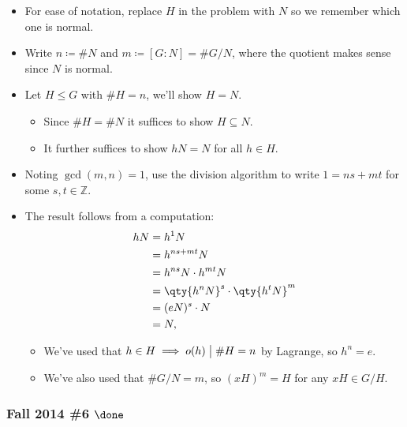 \begin{solution}

\envlist

\begin{itemize}
\tightlist
\item
  For ease of notation, replace \(H\) in the problem with \(N\) so we
  remember which one is normal.
\item
  Write \(n\coloneqq\# N\) and \(m \coloneqq[G:N] = \#G/N\), where the
  quotient makes sense since \(N\) is normal.
\item
  Let \(H \leq G\) with \(\# H = n\), we'll show \(H=N\).

  \begin{itemize}
  \tightlist
  \item
    Since \(\# H = \# N\) it suffices to show \(H \subseteq N\).
  \item
    It further suffices to show \(hN = N\) for all \(h\in H\).
  \end{itemize}
\item
  Noting \(\gcd(m, n)=1\), use the division algorithm to write
  \(1 = ns + mt\) for some \(s,t\in {\mathbb{Z}}\).
\item
  The result follows from a computation:
  \begin{align*}
  hN 
  &= h^1 N \\
  &= h^{ns + mt}N \\
  &= h^{ns} N \cdot h^{mt}N \\
  &= \qty{h^n N}^s \cdot \qty{h^t N}^m \\
  &= (eN)^s \cdot N \\
  &= N
  ,\end{align*}

  \begin{itemize}
  \tightlist
  \item
    We've used that \(h\in H \implies o(h) \bigm|\# H = n\) by Lagrange,
    so \(h^n = e\).
  \item
    We've also used that \(\# G/N = m\), so \((xH)^m = H\) for any
    \(xH\in G/H\).
  \end{itemize}
\end{itemize}

\end{solution}

\hypertarget{fall-2014-6-done}{%
\subsubsection{\texorpdfstring{Fall 2014 \#6
\(\done\)}{Fall 2014 \#6 \textbackslash done}}\label{fall-2014-6-done}}

